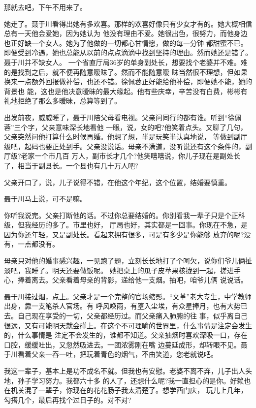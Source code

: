 \documentclass[11pt,a4paper,onecolumn]{article}
\begin{document}
那就去吧，下午不用来了。

她走了。聂于川看得出她有多欢喜。那样的欢喜好像只有少女才有的。她大概相信总有一天他会爱她，因为她认为
他没有理由不爱。她很出色，很努力，而他身边也正好缺一个女人。她为了他做的一切都心甘情愿，做的每一分钟
都甜蜜不已。即便受到冷遇，她也总能从以前的点点滴滴中找到坚持的理由。然而她还是错了。聂于川并不缺女人。
一个省直厅局36岁的单身副处长，想要找个老婆并不难。难的是找到之后，就不便再随意暧昧了。然而不能随意暧
昧当然很不理想，但如果换来一点额外回报做补偿，也还不错。徐佩蓉正好能给他补偿，即便她不能，她的背景也
能，这也是他决意暧昧的最大缘起。他有些庆幸，辛苦没有白费，彬彬有礼地拒绝了那么多暧昧，总算等到了。

出发前夜，威威睡了，聂于川陪父母看电视。父亲问同行的都有谁。听到“徐佩蓉”三个字，父亲意味深长地看他
一眼，说，女的吧?他笑着点头。又聊了几句，父亲突然问他打算什么时候再婚。他想了想，半是玩笑半认真地说，
等做到副厅级吧，起码也要正处到手。父亲没说话。母亲不满道，没听说还有这个条件的，副厅级?老家一个市几百
万人，副市长才几个?他笑嘻嘻说，你儿子现在是副处长了，相当于副县长。一个县也有几十万人吧?

父亲开口了，说，儿子说得不错，在他这个年纪，这个位置，结婚要慎重。

聂于川马上说，可不是嘛。

你听我说完。父亲打断他的话。不过你总要结婚的。你别看我一辈子只是个正科级，但我经历的多了。市里也好，
厅局也好，其实都是一回事。你现在不急，是因为你还年轻，又是副处长。看起来拥有很多，可是有多少是你能够
放弃的呢?没有，一点都没有。

母亲只对他的婚事感兴趣，一见跑了题，立刻长长地打了个呵欠，说你们爷儿俩扯淡吧，我睡了。明天还要做饭呢。
她把桌上的瓜子皮苹果核拢到一起，搓进手心，捧着离去。父亲看着母亲的背影，递给他一支烟。抽吧，咱爷儿俩
说说话。

聂于川接过烟，点上。父亲才是一个完整的官场缩影。“文革”老大专生，中学教师出身，靠一支笔杀人官场。有
呼风唤雨，有堕入尘埃，有众星捧月，也有大势已去。自己现在享受的一切，父亲都经历过。而父亲痛入肺腑的往
事，似乎离自己很远，又有可能明天就会碰上。在这个不可理喻的世界里，什么事情是注定会发生的，什么事情是
注定不会发生的，谁都不知道。父亲抽烟时喜欢深吸一口，存在口腔，缓缓吐出，又忽然吸进去。一团浓雾刚在嘴
边蔓延成形，却转眼不见。聂于川看着父亲一吞一吐，把玩着青色的烟气，不由笑道，您老就说吧。

我这一辈子，基本上是功不成名不就。但我也有安慰。老婆不离不弃，儿子出人头地，孙子学习努力。我都六十多
的人了，还想什么呢?我一直担心的是你。好赖也在机关混了一辈子，你现在的花花肠子我太清楚了。想学西门庆，
玩儿上几年，勾搭几个，最后再找个过日子的。对不对?
\end{document}
